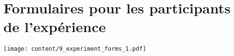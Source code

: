 \chapter{Formulaires pour les participants de l'expérience}
\label{annex:experiment_forms}

\texttt{[image: content/9\_experiment\_forms\_1.pdf]}


